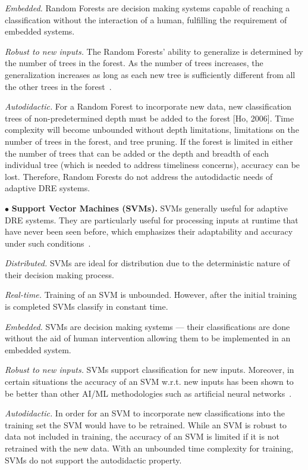 \documentclass[conference]{IEEEtran}
\begin{document}
\emph{Embedded.} Random Forests are decision making systems capable of reaching a classification without the interaction of a human, fulfilling the requirement of embedded systems.

\emph{Robust to new inputs.} The Random Forests' ability to generalize is determined by the number of trees in the forest. As the number of trees increases, the generalization increases as long as each new tree is sufficiently different from all the other trees in the forest~\cite{Ho:95}.

\emph{Autodidactic.} For a Random Forest to incorporate new data, new classification trees of non-predetermined depth must be added to the forest [Ho, 2006]. Time complexity will become unbounded without depth limitations, limitations on the number of trees in the forest, and tree pruning. If the forest is limited in either the number of trees that can be added or the depth and breadth of each individual tree (which is needed to address timeliness concerns), accuracy can be lost. Therefore, Random Forests do not address the autodidactic needs of adaptive DRE systems. 

$\bullet$ {\bf Support Vector Machines (SVMs).} SVMs generally useful for adaptive DRE systems. They are particularly useful for processing inputs at runtime that have never been seen before, which emphasizes their adaptability and accuracy under such conditions~\cite{Hoffert:11}.

\emph{Distributed.} SVMs are ideal for distribution due to the deterministic nature of their decision making process.

\emph{Real-time.} Training of an SVM is unbounded. However, after the initial training is completed SVMs classify in constant time.

\emph{Embedded.} SVMs are decision making systems --- their classifications are done without the aid of human intervention allowing them to be implemented in an embedded system.

\emph{Robust to new inputs.} SVMs support classification for new inputs. Moreover, in certain situations the accuracy of an SVM w.r.t. new  inputs has been shown to be better than other AI/ML methodologies such as artificial neural networks~\cite{Hoffert:11}.

\emph{Autodidactic.} In order for an SVM to incorporate new classifications into the training set the SVM would have to be retrained. While an SVM is robust to data not included in training, the accuracy of an SVM is limited if it is not retrained with the new data. With an unbounded time complexity for training, SVMs do not support the autodidactic property.
\end{document}
